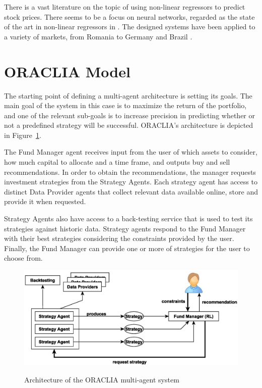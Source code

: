\documentclass{aamas2017-extabs}
\begin{document}
There is a vast literature on the topic of using non-linear regressors to predict stock prices. There seems to be a focus on neural networks, regarded as the state of the art in non-linear regressors in \cite{nemes2013data,hafezi2015bat,chenoweth1996embedding}. The designed systems have been applied to a variety of markets, from Romania \cite{nemes2013data} to Germany \cite{hafezi2015bat} and Brazil \cite{jabbur2014design}. 

\section{ORACLIA Model}
\label{sec-model}

The starting point of defining a multi-agent architecture is setting its goals. The main goal of the system in this case is to maximize the return of the portfolio, and one of the relevant sub-goals is to increase precision in predicting whether or not a predefined strategy will be successful. 
ORACLIA's architecture is depicted in Figure~\ref{fig-architecture}. 

The Fund Manager agent receives input from the user of which assets to consider, how much capital to allocate and a time frame, and outputs buy and sell recommendations. In order to obtain the recommendations, the manager requests investment strategies from the Strategy Agents. Each strategy agent has access to distinct Data Provider agents that collect relevant data available online, store and provide it when requested. 

Strategy Agents also have access to a back-testing service that is used to test its strategies against historic data. Strategy agents respond to the Fund Manager with their best strategies considering the constraints provided by the user. Finally, the Fund Manager can provide one or more of strategies for the user to choose from.

\begin{figure}[htb]
\centering
  \includegraphics[scale=0.32]{modelo-lucas.eps}\\
  \caption{Architecture of the ORACLIA multi-agent system}
  \label{fig-architecture}
\end{figure}
\end{document}
